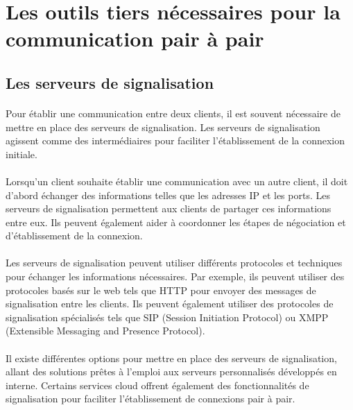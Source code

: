 \vspace{4cm}

\section{Les outils tiers nécessaires pour la communication pair à pair}
\subsection{Les serveurs de signalisation}

\paragraph{}
Pour établir une communication entre deux clients, il est souvent nécessaire de mettre en place des serveurs de signalisation. Les serveurs de signalisation agissent comme des intermédiaires pour faciliter 
l'établissement de la connexion initiale.

\paragraph{}
Lorsqu'un client souhaite établir une communication avec un autre client, il doit d'abord échanger des informations telles que les adresses IP et les ports. Les serveurs de signalisation permettent aux clients de partager ces 
informations entre eux. Ils peuvent également aider à coordonner les étapes de négociation et d'établissement de la connexion.

\paragraph{}
Les serveurs de signalisation peuvent utiliser différents protocoles et techniques pour échanger les informations nécessaires. Par exemple, ils peuvent utiliser des protocoles basés sur le web tels que HTTP pour envoyer des messages 
de signalisation entre les clients. Ils peuvent également utiliser des protocoles de signalisation spécialisés tels que SIP (Session Initiation Protocol) ou XMPP (Extensible Messaging and Presence Protocol).

\paragraph{}
Il existe différentes options pour mettre en place des serveurs de signalisation, allant des solutions prêtes à l'emploi aux serveurs personnalisés développés en interne. Certains services cloud offrent également des 
fonctionnalités de signalisation pour faciliter l'établissement de connexions pair à pair.

